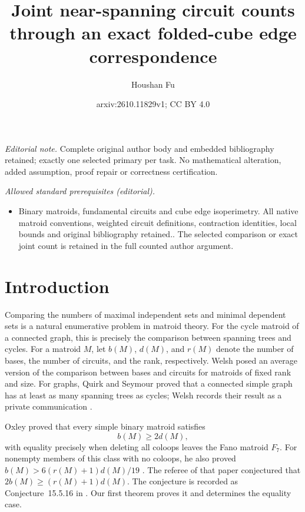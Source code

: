 \documentclass[10pt,a4paper]{article}
\title{Joint near-spanning circuit counts through an exact folded-cube edge correspondence}
\author{Houshan Fu}
\date{arxiv:2610.11829v1; CC BY 4.0}
\numberwithin{equation}{section}
\begin{document}
\maketitle
\noindent\textit{Editorial note.} Complete original author body and embedded bibliography retained; exactly one selected primary per task. No mathematical alteration, added assumption, proof repair or correctness certification.\par\medskip
\noindent\textit{Allowed standard prerequisites (editorial).}\begin{itemize}
\item Binary matroids, fundamental circuits and cube edge isoperimetry. All native matroid conventions, weighted circuit definitions, contraction identities, local bounds and original bibliography retained.. The selected comparison or exact joint count is retained in the full counted author argument.
\end{itemize}\medskip
\section{Introduction}

Comparing the numbers of maximal independent sets and minimal dependent
sets is a natural enumerative problem in matroid theory. For the cycle
matroid of a connected graph, this is precisely the comparison between
spanning trees and cycles.
For a matroid \(M\), let \(b(M)\), \(d(M)\), and \(r(M)\) denote
the number of bases, the number of circuits, and the rank, respectively.
Welsh \cite[p.~288, Exercise~5]{Welsh1976} posed an average version
of the comparison between bases and circuits for matroids of fixed
rank and size. For graphs, Quirk and Seymour proved that a connected
simple graph has at least as many spanning trees as cycles; Welsh
records their result as a private communication \cite[p.~287]{Welsh1976}.

Oxley \cite[Theorem~2.1]{Oxley1983} proved that every simple binary
matroid satisfies
\begin{equation}\label{eq:oxley}
 b(M)\ge2d(M),
\end{equation}
with equality precisely when deleting all coloops leaves the Fano
matroid \(F_7\). For nonempty members of this class with no coloops,
he also proved \(b(M)>6(r(M)+1)d(M)/19\)
\cite[Theorem~3.1]{Oxley1983}. The referee of that paper conjectured
that \(2b(M)\ge(r(M)+1)d(M)\).
The conjecture is recorded as Conjecture~15.5.16 in \cite{Oxley2011}.
Our first theorem proves it and determines the equality case.
\end{document}
